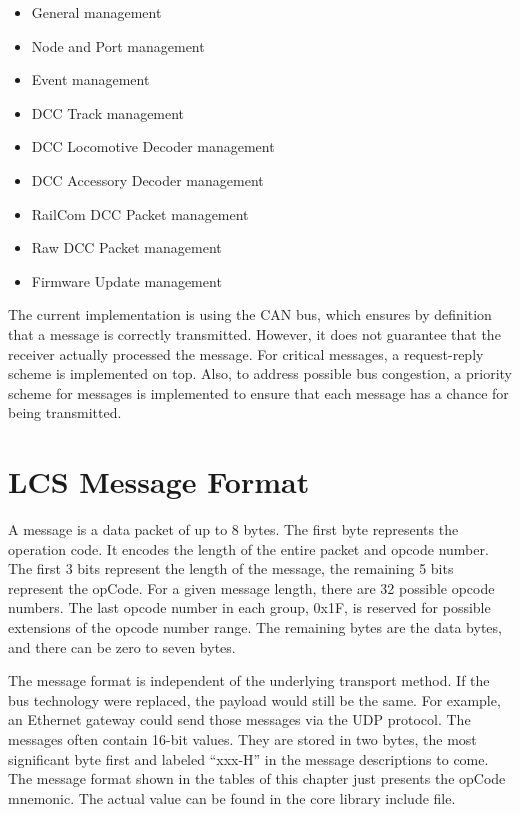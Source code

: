 \begin{itemize}
    \item General management
    \item Node and Port management
    \item Event management
    \item DCC Track management
    \item DCC Locomotive Decoder management
    \item DCC Accessory Decoder management
    \item RailCom DCC Packet management
    \item Raw DCC Packet management
    \item Firmware Update management
\end{itemize}

The current implementation is using the CAN bus, which ensures by definition that a message is correctly transmitted. However, it does not guarantee that the receiver actually processed the message. For critical messages, a request-reply scheme is implemented on top. Also, to address possible bus congestion, a priority scheme for messages is implemented to ensure that each message has a chance for being transmitted.

\section{LCS Message Format}

A message is a data packet of up to 8 bytes. The first byte represents the operation code. It encodes the length of the entire packet and opcode number. The first 3 bits represent the length of the message, the remaining 5 bits represent the opCode. For a given message length, there are 32 possible opcode numbers. The last opcode number in each group, 0x1F, is reserved for possible extensions of the opcode number range. The remaining bytes are the data bytes, and there can be zero to seven bytes. 

The message format is independent of the underlying transport method. If the bus technology were replaced, the payload would still be the same. For example, an Ethernet gateway could send those messages via the UDP protocol. The messages often contain 16-bit values. They are stored in two bytes, the most significant byte first and labeled ``xxx-H'' in the message descriptions to come. The message format shown in the tables of this chapter just presents the opCode mnemonic. The actual value can be found in the core library include file.

